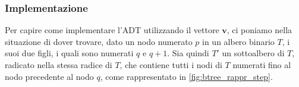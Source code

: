 \subsubsection{Implementazione}
Per capire come implementare l'ADT utilizzando il vettore $\mathbf{v}$, ci poniamo
nella situazione di dover trovare, dato un nodo numerato $p$ in un albero
binario $T$, i suoi due figli, i quali sono numerati $q$ e $q+1$.
Sia quindi $T'$ un sottoalbero di $T$, radicato nella stessa radice di $T$,
che contiene tutti i nodi di $T$ numerati fino al nodo precedente
al nodo $q$, come rappresentato in \cref{fig:btree_rappr_step}.


\begin{figure}[h]
	\centering




	\begin{tikzpicture}[x=0.75pt,y=0.75pt,yscale=-1,xscale=1]


\end{tikzpicture}
\end{figure}
